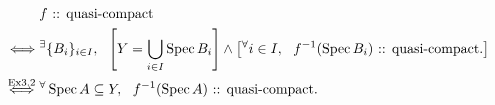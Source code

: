 \documentclass[a4paper]{jsarticle}
\begin{document}
\begin{Def}
\begin{align*}
    {}&     f\text{ :: quasi-compact} \\
    \iff&
            {}^{\exists} \{B_i\}_{i \in I},~~
            \left[Y=\bigcup_{i \in I} \operatorname{Spec} B_i\right] \land \left[{}^{\forall} i \in I,~~ f^{-1}(\operatorname{Spec} B_i)\text{ :: quasi-compact.}\right] \\
    \overset{\text{ Ex3.2 }}{\iff}&
            {}^{\forall} \operatorname{Spec} A \subseteq Y,~~ f^{-1}(\operatorname{Spec} A)\text{ :: quasi-compact.}
\end{align*}
\end{Def}
\end{document}
